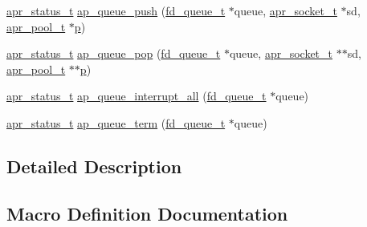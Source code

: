 \begin{DoxyCompactItemize}
\hyperlink{group__apr__errno_gaa5105fa83cc322f09382292db8b47593}{apr\+\_\+status\+\_\+t} \hyperlink{group__APACHE__MPM__WORKER_gacd3fbdf78efce43a6fa7ca4e8e254707}{ap\+\_\+queue\+\_\+push} (\hyperlink{structfd__queue__t}{fd\+\_\+queue\+\_\+t} $\ast$queue, \hyperlink{structapr__socket__t}{apr\+\_\+socket\+\_\+t} $\ast$sd, \hyperlink{structapr__pool__t}{apr\+\_\+pool\+\_\+t} $\ast$\hyperlink{group__APACHE__CORE__MPM_ga5cd91701e5c167f2b1a38e70ab57817e}{p})
\item 
\hyperlink{group__apr__errno_gaa5105fa83cc322f09382292db8b47593}{apr\+\_\+status\+\_\+t} \hyperlink{group__APACHE__MPM__WORKER_gaa0a7d0fbf57c588d863174ae5dbb1899}{ap\+\_\+queue\+\_\+pop} (\hyperlink{structfd__queue__t}{fd\+\_\+queue\+\_\+t} $\ast$queue, \hyperlink{structapr__socket__t}{apr\+\_\+socket\+\_\+t} $\ast$$\ast$sd, \hyperlink{structapr__pool__t}{apr\+\_\+pool\+\_\+t} $\ast$$\ast$\hyperlink{group__APACHE__CORE__MPM_ga5cd91701e5c167f2b1a38e70ab57817e}{p})
\item 
\hyperlink{group__apr__errno_gaa5105fa83cc322f09382292db8b47593}{apr\+\_\+status\+\_\+t} \hyperlink{group__APACHE__MPM__WORKER_ga6a9df0d76a287d52f8ea78b6ebce9c27}{ap\+\_\+queue\+\_\+interrupt\+\_\+all} (\hyperlink{structfd__queue__t}{fd\+\_\+queue\+\_\+t} $\ast$queue)
\item 
\hyperlink{group__apr__errno_gaa5105fa83cc322f09382292db8b47593}{apr\+\_\+status\+\_\+t} \hyperlink{group__APACHE__MPM__WORKER_gabd40aa9d9c5f2cd9a23d912200158c5f}{ap\+\_\+queue\+\_\+term} (\hyperlink{structfd__queue__t}{fd\+\_\+queue\+\_\+t} $\ast$queue)
\end{DoxyCompactItemize}


\subsection{Detailed Description}


\subsection{Macro Definition Documentation}
